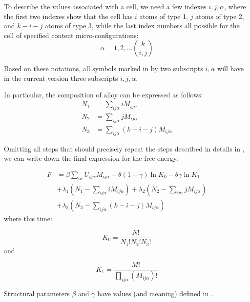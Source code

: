\documentclass[12pt,abstract]{scrartcl}
\begin{document}
To describe the values associated with a cell, we need a few indexes \( i, j, \alpha \), where the first two indexes 
show that the cell has \( i \) atoms of type 1, \( j \) atoms of type 2, and  \( k - i -j \) atoms of type 3, while the last index numbers all possible for the cell of specified content micro-configurations:
\[ \alpha = 1, 2, \dots \binom{k}{i, j} \]

Based on these notations, all symbols marked in \cite{TISR_p1} by two subscripts \( i,  \alpha \) will have in the  current version three subscripts \( i, j, \alpha \). 

In particular, the composition of alloy  can be expressed as follows:
\begin{equation} \label{N1}
\begin{split}
    N_1 &= \sum_{i j\alpha} i M_{i j \alpha}\\
    N_2 &= \sum_{i j\alpha} j M_{i j \alpha}\\
   N_3 &= \sum_{i j \alpha} (k-i -j) M_{i j \alpha}
\end{split}
\end{equation}



Omitting all  steps that should precisely repeat the steps described in details in  \cite{TISR_p1}, we can  write down the final expression for the free energy:

\begin{equation} \label{free_energy}
\begin{split}
    F &= \beta\sum_{i\alpha} U_{i j \alpha} M_{i j \alpha} - \theta(1- \gamma) \ln K_0 - \theta \gamma \ln K_1\\ &+ \lambda_1 \left(N_1 - \sum_{i j \alpha} i M_{i j \alpha} \right) 
+ \lambda_2 \left(N_2 - \sum_{i j \alpha} j M_{i j \alpha}   \right) \\ &
+ \lambda_3 \left(N_3- \sum_{i j \alpha} (k-i-j) M_{i j \alpha}   \right)
\end{split}
\end{equation}
where this time:


\begin{equation} \label{bragg}
K_0 = \frac{N!}{N_1! N_2! N_3!}
\end{equation}
and


\begin{equation} \label{K1}
K_1 = \frac{M!}{\prod\limits_{i j \alpha} ( M_{i j \alpha})!}
\end{equation}

Structural parameters \( \beta \) and \( \gamma \) have values (and meaning) defined in \cite{TISR_p1, TISR_p4}.
\end{document}
